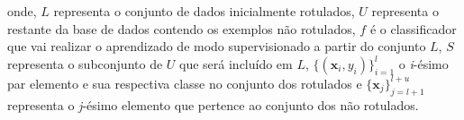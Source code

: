 	
    \vspace{-1em}
    \noindent
	onde, $L$ representa o conjunto de dados inicialmente rotulados, $U$ representa o restante da base de dados contendo os exemplos não rotulados, $f$ é o classificador que vai realizar o aprendizado de modo supervisionado a partir do conjunto $L$, $S$ representa o subconjunto de $U$ que será incluído em $L$, $\{(\mathbf{x}_i, y_i)\}^l_{i = 1}$ o \textit{i}\hyp{ésimo} par elemento e sua respectiva classe no conjunto dos rotulados e $\{\mathbf{x}_j\}^{l+u}_{j=l+1}$ representa o \textit{j}\hyp{ésimo} elemento que pertence ao conjunto dos não rotulados.
